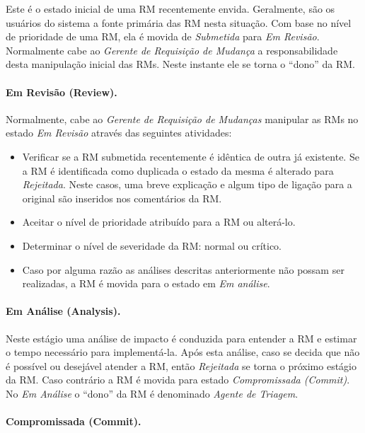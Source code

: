 Este é o estado inicial de uma RM recentemente envida. Geralmente, são os
usuários do sistema a fonte primária das RM nesta situação. Com base no nível de
prioridade de uma RM, ela é movida de \textit{Submetida} para \textit{Em
	Revisão}. Normalmente cabe ao \textit{Gerente de Requisição de Mudança} a
responsabilidade desta manipulação inicial das RMs. Neste instante ele se torna
o ``dono'' da RM\@.

\paragraph{Em Revisão (Review).}
\label{par:em_revisao}
Normalmente, cabe ao \textit{Gerente de Requisição de Mudanças} manipular as
RMs no estado \textit{Em Revisão} através das seguintes atividades:

\begin{itemize}
	\item Verificar se a RM submetida recentemente é idêntica de outra já
		existente. Se a RM é identificada como duplicada o estado da mesma é
		alterado para \textit{Rejeitada}. Neste casos, uma breve explicação e
		algum tipo de ligação para a original são inseridos nos comentários da
		RM\@.
	\item Aceitar o nível de prioridade atribuído para a RM ou alterá-lo.
	\item Determinar o nível de severidade da RM\@: normal ou crítico.
	\item Caso por alguma razão as análises descritas anteriormente não possam
		ser re\-a\-li\-za\-das, a RM é movida para o estado em \textit{Em análise}.
\end{itemize}

\paragraph{Em Análise (Analysis).}
\label{par:em_analise}
Neste estágio uma análise de impacto é conduzida para entender a RM e estimar o
tempo necessário para implementá-la. Após esta análise, caso se decida que não é
possível ou desejável atender a RM, então \textit{Rejeitada} se torna o próximo
estágio da RM\@. Caso contrário a RM é movida para estado \textit{Compromissada
	(Commit)}. No  \textit{Em Análise} o ``dono'' da RM é denominado
\textit{Agente de Triagem}.

\paragraph{Compromissada (Commit).}
\label{par:commit}

